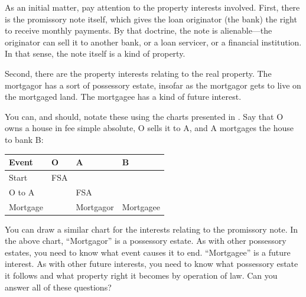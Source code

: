 
\item \label{mortgage-interests} As an initial matter, pay attention to the
property interests involved.
First, there is the promissory note itself, which gives the loan originator (the
bank) the right to receive monthly payments.
By that doctrine, the note is alienable---the originator can sell it to another
bank, or a loan servicer, or a financial institution. In that sense, the note
itself is a kind of property.


Second, there are the property interests relating to the real property.
The mortgagor has a sort of possessory estate, insofar as the mortgagor gets to
live on the mortgaged land. The mortgagee has a kind of future interest.

You can, and should, notate these using the charts presented in
.
Say that O owns a house in fee simple absolute, O
sells it to A, and A mortgages the house to bank B:
\begin{center}
\begin{tabular}{l|lll}
Event & O & A & B \\
\hline
Start & FSA & & \\
O to A & & FSA & \\
Mortgage & & Mortgagor & Mortgagee \\
\end{tabular}
\end{center}
You can draw a similar chart for the interests relating to the promissory note.
In the above chart, ``Mortgagor'' is a possessory estate. As with other
possessory estates, you need to know what event causes it to end. ``Mortgagee''
is a future interest. As with other future interests, you need to know what
possessory estate it follows and what property right it becomes by operation of
law. Can you answer all of these questions?

